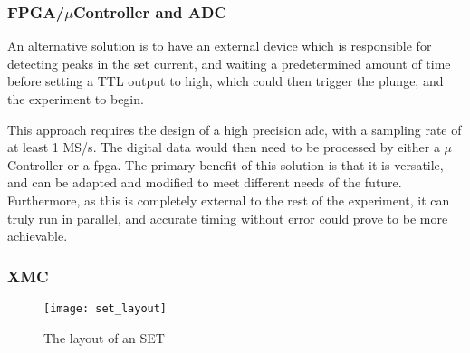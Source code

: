 \subsubsection{FPGA/$\mu$Controller and ADC}
An alternative solution is to have an external device which is responsible for detecting peaks in the \gls{set} current, and waiting a predetermined amount of time before setting a TTL output to high, which could then trigger the plunge, and the experiment to begin.

This approach requires the design of a high precision \gls{adc}, with a sampling rate of at least 1 MS/s. The digital data would then need to be processed by either a $\mu$Controller or a \gls{fpga}. The primary benefit of this solution is that it is versatile, and can be adapted and modified to meet different needs of the future. Furthermore, as this is completely external to the rest of the experiment, it can truly run in parallel, and accurate timing without error could prove to be more achievable.
\subsubsection{XMC}

\begin{figure}[htbp!]
	\centering
	\texttt{[image: set\_layout]}
	\caption{The layout of an SET}
	\label{fig::set_layout}
\end{figure}